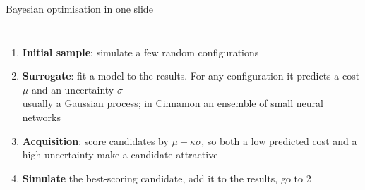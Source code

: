 \documentclass[aspectratio=169,11pt]{ccc-beamer}
\begin{document}
\begin{frame}{Bayesian optimisation in one slide}
  \begin{columns}[T]
    \begin{enumerate}
      \item \textbf{Initial sample}: simulate a few random configurations
      \item \textbf{Surrogate}: fit a model to the results. For any configuration it predicts a cost $\mu$ and an uncertainty $\sigma$ \\ \small usually a Gaussian process; in Cinnamon an ensemble of small neural networks
      \item \textbf{Acquisition}: score candidates by $\mu - \kappa\sigma$, so both a low predicted cost and a high uncertainty make a candidate attractive
      \item \textbf{Simulate} the best-scoring candidate, add it to the results, go to 2
    \end{enumerate}
\end{columns}
\end{frame}
\end{document}
